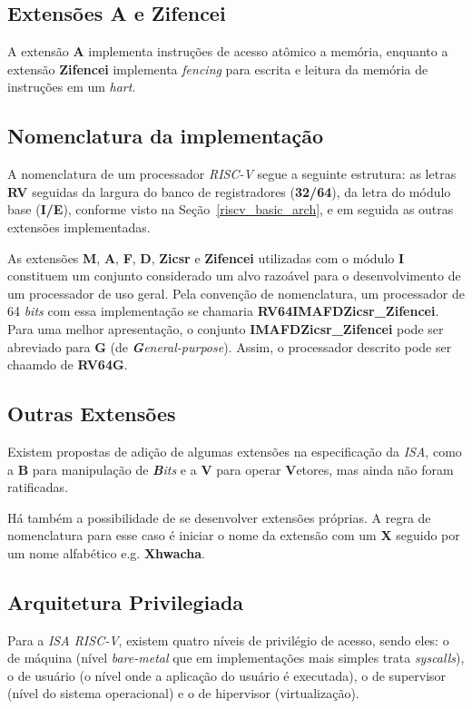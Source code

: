     \subsection{Extensões A e Zifencei}
    { A extensão \textbf{A} implementa instruções de acesso atômico a memória,
        enquanto a extensão \textbf{Zifencei} implementa \textit{fencing}
        para escrita e leitura da memória de instruções em um \textit{hart}.
    }

    \subsection{Nomenclatura da implementação}
    { A nomenclatura de um processador \textit{RISC-V} segue a seguinte
        estrutura: as letras \textbf{RV} seguidas da largura do banco de
        registradores (\textbf{32/64}), da letra do módulo base (\textbf{I/E}),
        conforme visto na Seção~\ref{riscv_basic_arch}, e em seguida as outras
        extensões implementadas.
    }

    { As extensões \textbf{M}, \textbf{A}, \textbf{F}, \textbf{D},
        \textbf{Zicsr} e \textbf{Zifencei} utilizadas com o módulo \textbf{I}
        constituem um conjunto considerado um alvo razoável para o
        desenvolvimento de um processador de uso geral. Pela convenção de
        nomenclatura, um processador de 64 \textit{bits} com essa implementação
        se chamaria \textbf{RV64IMAFDZicsr\_Zifencei}. Para uma melhor
        apresentação, o conjunto \textbf{IMAFDZicsr\_Zifencei} pode ser abreviado
        para \textbf{G} (de \textit{\textbf{G}eneral-purpose}). Assim, o
        processador descrito pode ser chaamdo de \textbf{RV64G}.
    }

    \subsection{Outras Extensões}
    { Existem propostas de adição de algumas extensões na especificação da
        \textit{ISA}, como a \textbf{B} para manipulação de \textit{\textbf{B}its}
        e a \textbf{V} para operar \textbf{V}etores, mas ainda não foram
        ratificadas.
    }

    {Há também a possibilidade de se desenvolver extensões próprias. A regra
        de nomenclatura para esse caso é iniciar o nome da extensão com um
        \textbf{X} seguido por um nome alfabético e.g. \textbf{Xhwacha}.
    }

    \subsection{Arquitetura Privilegiada}
    { Para a \textit{ISA RISC-V}, existem quatro níveis de privilégio de acesso,
        sendo eles: o de máquina (nível \textit{bare-metal} que em implementações
        mais simples trata \textit{syscalls}), o de usuário (o nível onde a
        aplicação do usuário é executada), o de supervisor (nível do sistema
        operacional) e o de hipervisor (virtualização).
    }

